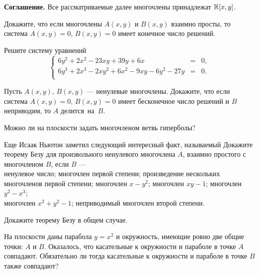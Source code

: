 \documentclass[a4paper,12pt]{article}
\begin{document}
\noindent
{\bf Соглашение.} Все рассматриваемые далее многочлены принадлежат $\mathbb{R}[x,y]$.

 Докажите, что если многочлены $A(x,y)$ и $B(x,y)$ взаимно просты,
то система $A(x,y)=0$, $B(x,y)=0$ имеет конечное число решений.


  Решите систему уравнений
$$
\left\{
\begin{array}{rcl}
6y^2+2x^2-23xy+39y+6x&=&0,\\
6y^3+2x^3-2xy^2+6x^2-9xy-6y^2-27y&=&0.\\
\end{array}
\right.
$$


 Пусть $A(x,y)$, $B(x,y)$ --- ненулевые многочлены.
Докажите, что если система $A(x,y)=0$, $B(x,y)=0$
имеет бесконечное число решений
и %
$B$ неприводим, то $A$ делится~\hbox{на $B$.}


 Можно ли на плоскости задать многочленом ветвь гиперболы?


  Еще Исаак Ньютон заметил следующий интересный факт, называемый
\/
\/
Докажите
теорему Безу  для произвольного ненулевого многочлена $A$,
взаимно простого с многочленом $B$, если $B$ ---\\
 ненулевое число;\quad
{} многочлен первой степени;\quad
{} произведение нескольких многочленов первой степени;\quad
{} многочлен $x-y^2$;\quad
{} многочлен $xy-1$;\quad
{} многочлен $y^2-x^3$;\\
  многочлен $x^2+y^2-1$;\quad
{} неприводимый многочлен второй степени.

 Докажите теорему Безу в общем случае.

На плоскости даны парабола $y=x^2$ и окружность, имеющие ровно две
общие точки: $A$ и $B$. Оказалось, что касательные к окружности и параболе
в точке $A$ совпадают. Обязательно ли тогда касательные
к окружности и параболе в точке $B$ также совпадают?


{}
\end{document}
